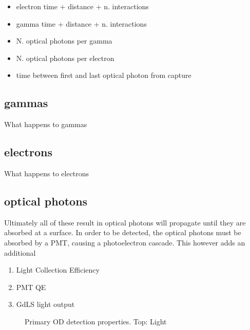 \begin{itemize}
    \item electron time + distance + n. interactions
    \item gamma time + distance + n. interactions
    \item N. optical photons per gamma
    \item N. optical photons per electron
    \item time between first and last optical photon from capture
\end{itemize}

\subsection{gammas}
\par
What happens to gammas



\subsection{electrons}
\par
What happens to electrons


\subsection{optical photons}
\par
Ultimately all of these result in optical photons will propagate until they are absorbed at a surface.
In order to be detected, the optical photons must be absorbed by a PMT, causing a photoelectron cascade.
This however adds an additional 

\begin{tcolorbox}[colback=red!5!white, colframe=red!50!black, title=Key Plots]
\begin{enumerate}
    \item Light Collection Efficiency
    \item PMT QE
    \item GdLS light output
\end{enumerate}
\end{tcolorbox}


\begin{figure}[!htbp]%
\centering
{}
\caption{Primary OD detection properties. Top: Light 
}
\label{fig:od_detection_properties}
\end{figure}


